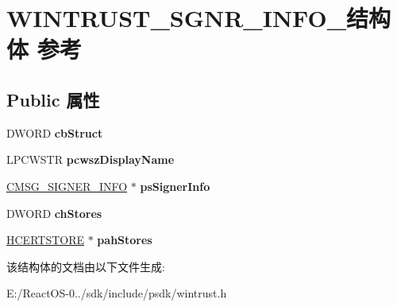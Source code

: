 \hypertarget{struct_w_i_n_t_r_u_s_t___s_g_n_r___i_n_f_o__}{}\section{W\+I\+N\+T\+R\+U\+S\+T\+\_\+\+S\+G\+N\+R\+\_\+\+I\+N\+F\+O\+\_\+结构体 参考}
\label{struct_w_i_n_t_r_u_s_t___s_g_n_r___i_n_f_o__}
\subsection*{Public 属性}
\begin{DoxyCompactItemize}
\item 
\mbox{\label{struct_w_i_n_t_r_u_s_t___s_g_n_r___i_n_f_o___a99b078cc35344ab62bf4284937676874}} 
D\+W\+O\+RD {\bfseries cb\+Struct}
\item 
\mbox{\label{struct_w_i_n_t_r_u_s_t___s_g_n_r___i_n_f_o___aa530c33169a1429a05007a1a169e97d7}} 
L\+P\+C\+W\+S\+TR {\bfseries pcwsz\+Display\+Name}
\item 
\mbox{\label{struct_w_i_n_t_r_u_s_t___s_g_n_r___i_n_f_o___a0c3a95153d6490797ad7c2996081ecdc}} 
\hyperlink{struct___c_m_s_g___s_i_g_n_e_r___i_n_f_o}{C\+M\+S\+G\+\_\+\+S\+I\+G\+N\+E\+R\+\_\+\+I\+N\+FO} $\ast$ {\bfseries ps\+Signer\+Info}
\item 
\mbox{\label{struct_w_i_n_t_r_u_s_t___s_g_n_r___i_n_f_o___a8f2c39160e5a043749a43f5aca5fbfb4}} 
D\+W\+O\+RD {\bfseries ch\+Stores}
\item 
\mbox{\label{struct_w_i_n_t_r_u_s_t___s_g_n_r___i_n_f_o___a303ba08714a1659c7bff4a2e8c712e87}} 
\hyperlink{interfacevoid}{H\+C\+E\+R\+T\+S\+T\+O\+RE} $\ast$ {\bfseries pah\+Stores}
\end{DoxyCompactItemize}


该结构体的文档由以下文件生成\+:\begin{DoxyCompactItemize}
\item 
E\+:/\+React\+O\+S-\/0../sdk/include/psdk/wintrust.\+h\end{DoxyCompactItemize}
